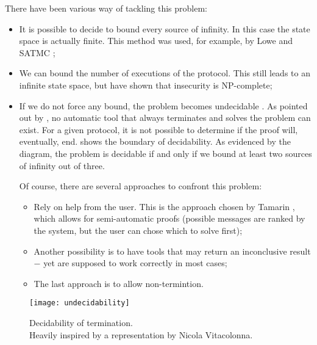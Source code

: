 There have been various way of tackling this problem:
\begin{itemize}
    \item{It is possible to decide to bound every source of infinity. In this case the state space is actually finite. This method was used, for example, by Lowe \cite{LoweNeedhamSchroederPK} and SATMC \cite{SATMC};}

    \item{We can bound the number of executions of the protocol. This still leads to an infinite state space, but \cite{SymbolicModelNPCompleteInsecurity} have shown that insecurity is NP-complete;}
    
    \item{If we do not force any bound, the problem becomes undecidable \cite{SymbolicModelUndecidability1} \cite{SymbolicModelUndecidability2}. As pointed out by \cite{SymbolicVerificationBlanchet}, no automatic tool that always terminates and solves the problem can exist. For a given protocol, it is not possible to determine if the proof will, eventually, end.  shows the boundary of decidability. As evidenced by the diagram, the problem is decidable if and only if we bound at least two sources of infinity out of three.

    Of course, there are several approaches to confront this problem:

    \begin{itemize}
        \item{Rely on help from the user. This is the approach chosen by Tamarin \cite{TamarinFoundations}, which allows for semi-automatic proofs (possible messages are ranked by the system, but the user can chose which to solve first);}
        \item{Another possibility is to have tools that may return an inconclusive result $-$ yet are supposed to work correctly in most cases;}
        \item{The last approach is to allow non-termintion.}
    \end{itemize}
    }
\end{itemize}


\begin{figure}[t]
    \texttt{[image: undecidability]}
    \centering
    \caption{Decidability of termination.\\Heavily inspired by a representation by Nicola Vitacolonna.}
    \label{fig:undecidability}
\end{figure}

